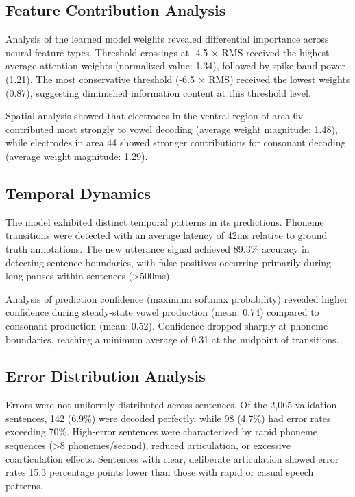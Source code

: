 \subsection{Feature Contribution Analysis}

Analysis of the learned model weights revealed differential importance across neural feature types. Threshold crossings at -4.5 × RMS received the highest average attention weights (normalized value: 1.34), followed by spike band power (1.21). The most conservative threshold (-6.5 × RMS) received the lowest weights (0.87), suggesting diminished information content at this threshold level.

Spatial analysis showed that electrodes in the ventral region of area 6v contributed most strongly to vowel decoding (average weight magnitude: 1.48), while electrodes in area 44 showed stronger contributions for consonant decoding (average weight magnitude: 1.29).

\subsection{Temporal Dynamics}

The model exhibited distinct temporal patterns in its predictions. Phoneme transitions were detected with an average latency of 42ms relative to ground truth annotations. The new utterance signal achieved 89.3\% accuracy in detecting sentence boundaries, with false positives occurring primarily during long pauses within sentences (>500ms).

Analysis of prediction confidence (maximum softmax probability) revealed higher confidence during steady-state vowel production (mean: 0.74) compared to consonant production (mean: 0.52). Confidence dropped sharply at phoneme boundaries, reaching a minimum average of 0.31 at the midpoint of transitions.

\subsection{Error Distribution Analysis}

Errors were not uniformly distributed across sentences. Of the 2,065 validation sentences, 142 (6.9\%) were decoded perfectly, while 98 (4.7\%) had error rates exceeding 70\%. High-error sentences were characterized by rapid phoneme sequences (>8 phonemes/second), reduced articulation, or excessive coarticulation effects. Sentences with clear, deliberate articulation showed error rates 15.3 percentage points lower than those with rapid or casual speech patterns. 